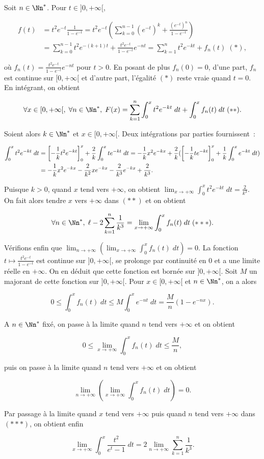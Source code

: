 {\begin{enumerate}
{Soit $n\in\Nn^*$. Pour $t\in]0,+\infty[$,

\begin{align*}
f(t)&=t^2e^{-t}\frac{1}{1-e^{-t}}=t^2e^{-t}(\sum_{k=0}^{n-1}(e^{-t})^k+\frac{(e^{-t})^{n}}{1-e^{-t}})\\
 &=\sum_{k=0}^{n-1}t^2e^{-(k+1)t}+\frac{t^2e^{-t}}{1-e^{-t}}e^{-nt}=\sum_{k=1}^{n}t^2e^{-kt}+f_n(t)\;(*),
\end{align*}

où $f_n(t)=\frac{t^2e^{-t}}{1-e^{-t}}e^{-nt}$ pour $t>0$. En posant de plus $f_n(0)=0$, d'une part, $f_n$ est continue sur $[0,+\infty[$ et d'autre part, l'égalité $(*)$ reste vraie quand $t=0$. En intégrant, on obtient

$$\forall x\in[0,+\infty[,\;\forall n\in\Nn^*,\;F(x)=\sum_{k=1}^{n}\int_{0}^{x}t^2e^{-kt}\;dt+\int_{0}^{x}f_n(t)\;dt\;(**).$$

Soient alors $k\in\Nn^*$ et $x\in[0,+\infty[$. Deux intégrations par parties fournissent~:

\begin{align*}\ensuremath
\int_{0}^{x}t^2e^{-kt}\;dt&=\left[-\frac{1}{k}t^2e^{-kt}\right]_{0}^{x}+\frac{2}{k}\int_{0}^{x}te^{-kt}\;dt
=-\frac{1}{k}x^2e^{-kx}+\frac{2}{k}(\left[-\frac{1}{k}te^{-kt}\right]_{0}^{x}+\frac{1}{k}\int_{0}^{x}e^{-kt}\;dt)\\
 &=-\frac{1}{k}x^2e^{-kx}-\frac{2}{k^2}xe^{-kx}-\frac{2}{k^3}e^{-kx}+\frac{2}{k^3}.
\end{align*}

Puisque $k>0$, quand $x$ tend vers $+\infty$, on obtient $\lim_{x\rightarrow +\infty}\int_{0}^{x}t^2e^{-kt}\;dt=\frac{2}{k^3}$. On fait alors tendre $x$ vers $+\infty$ dans $(**)$ et on obtient

$$\forall n\in\Nn^*,\;\ell-2\sum_{k=1}^{n}\frac{1}{k^3}=\lim_{x\rightarrow +\infty}\int_{0}^{x}f_n(t)\;dt\;(***).$$

Vérifions enfin que $\lim_{n\rightarrow +\infty}\left(\lim_{x\rightarrow +\infty}\int_{0}^{x}f_n(t)\;dt\right)=0$. La fonction $t\mapsto\frac{t^2e^{-t}}{1-e^{-t}}$ est continue sur $]0,+\infty[$, se prolonge par continuité en $0$ et a une limite réelle en $+\infty$. On en déduit que cette fonction est bornée sur $]0,+\infty[$. Soit $M$ un majorant de cette fonction sur $]0,+\infty[$. Pour $x\in[0,+\infty[$ et $n\in\Nn^*$, on a alors

$$0\leq\int_{0}^{x}f_n(t)\;dt\leq M\int_{0}^{x}e^{-nt}\;dt=\frac{M}{n}(1-e^{-nx}).$$

A $n\in\Nn^*$ fixé, on passe à la limite quand $n$ tend vers $+\infty$ et on obtient

$$0\leq\lim_{x\rightarrow +\infty}\int_{0}^{x}f_n(t)\;dt\leq\frac{M}{n},$$

puis on passe à la limite quand $n$ tend vers $+\infty$ et on obtient

$$\lim_{n\rightarrow +\infty}\left(\lim_{x\rightarrow +\infty}\int_{0}^{x}f_n(t)\;dt\right)=0.$$

Par passage à la limite quand $x$ tend vers $+\infty$ puis quand $n$ tend vers $+\infty$ dans $(***)$, on obtient enfin

$$\lim_{x\rightarrow +\infty}\int_{0}^{x}\frac{t^2}{e^t-1}\;dt=2\lim_{n\rightarrow +\infty}\sum_{k=1}^{n}\frac{1}{k^3}.$$}
\end{enumerate}
}
